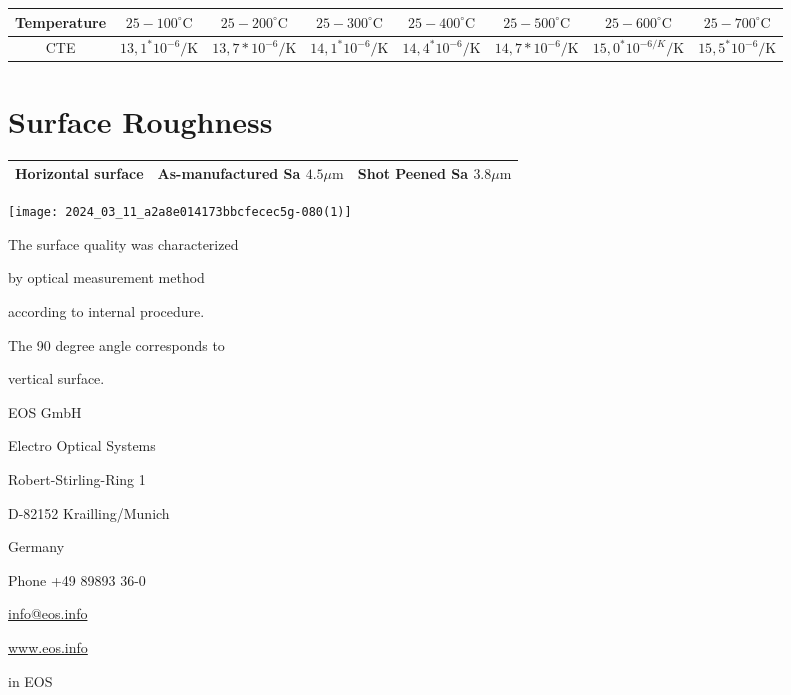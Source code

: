 \documentclass[10pt]{article}
\begin{document}
\begin{center}
\begin{tabular}{|c|c|c|c|c|c|c|c|}
\hline
Temperature & $25-100^{\circ} \mathrm{C}$ & $25-200^{\circ} \mathrm{C}$ & $25-300^{\circ} \mathrm{C}$ & $25-400^{\circ} \mathrm{C}$ & $25-500^{\circ} \mathrm{C}$ & $25-600^{\circ} \mathrm{C}$ & $25-700^{\circ} \mathrm{C}$ \\
\hline
CTE & $13,1^{*} 10^{-6} / \mathrm{K}$ & $13,7 * 10^{-6} / \mathrm{K}$ & $14,1^{*} 10^{-6} / \mathrm{K}$ & $14,4^{*} 10^{-6} / \mathrm{K}$ & $14,7 * 10^{-6} / \mathrm{K}$ & $15,0^{*} 10^{-6 / K} / \mathrm{K}$ & $15,5^{*} 10^{-6} / \mathrm{K}$ \\
\hline
\end{tabular}
\end{center}

\section*{Surface Roughness}
\begin{center}
\begin{tabular}{|c|c|c|}
\hline
Horizontal surface & As-manufactured Sa $4.5 \mu \mathrm{m}$ & Shot Peened Sa $3.8 \mu \mathrm{m}$ \\
\hline
\end{tabular}
\end{center}

\begin{center}
\texttt{[image: 2024\_03\_11\_a2a8e014173bbcfecec5g-080(1)]}
\end{center}

The surface quality was characterized

by optical measurement method

according to internal procedure.

The 90 degree angle corresponds to

vertical surface.

EOS GmbH

Electro Optical Systems

Robert-Stirling-Ring 1

D-82152 Krailling/Munich

Germany

Phone +49 89893 36-0

\href{mailto:info@eos.info}{info@eos.info}

\href{http://www.eos.info}{www.eos.info}

in EOS
\end{document}
